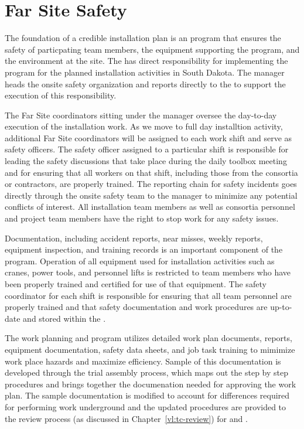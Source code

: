 \section{Far Site Safety}
\label{sec:far_site_safety}

The foundation of a credible installation plan is 
an  program that ensures the safety of particpating team 
members, the equipment supporting the program, and the environment 
at the  site.  The  has direct responsibility 
for implementing the   program for
the planned installation activities in South Dakota.  
The   manager heads the onsite safety 
organization and reports directly to the  to support
the execution of this responsibility.

The Far Site  coordinators sitting under the
  manager oversee the day-to-day execution
of the installation work. As we move to full day installtion activity,
additional Far Site  coordinators will be assigned to each
work shift and serve as safety officers.  The safety officer assigned
to a particular shift is responsible for leading the safety
discussions that take place during the daily toolbox meeting and for
ensuring that all workers on that shift, including those from the
consortia or contractors, are properly trained.  The reporting chain for safety
incidents goes directly through the onsite safety team to the
  manager to minimize any potential
conflicts of interest.  All  installation team members as
well as  consortia personnel and  project team
members have the right to stop work for any safety issues.

Documentation, including accident reports, near misses, weekly reports, 
equipment inspection, and training records is an important component of 
the   program.  Operation of all equipment 
used for  installation activities such as cranes, power 
tools, and personnel lifts is restricted to team members who have been
properly trained and certified for use of that equipment.  The safety 
coordinator for each shift is responsible for ensuring that all team 
personnel are properly trained and that safety documentation and work 
procedures are up-to-date and stored within the .  

The work planning and  program utilizes detailed work plan
documents,  reports, equipment documentation, safety data
sheets,  and job task training to mimimize work place
hazards and maximize efficiency.  Sample of this documentation is developed
through the  trial assembly process, which maps out
the step by step procedures and brings together the documenation
needed for approving the work plan.  The sample documentation is modified to
account for differences required for performing work underground and
the updated procedures are provided to the review process (as
discussed in Chapter~\ref{vl:tc-review}) for  and
.

